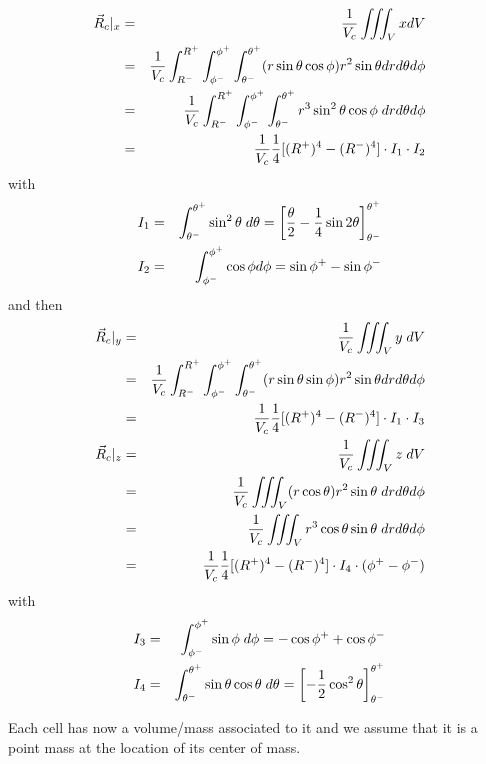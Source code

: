 \begin{eqnarray}
\vec{R}_c|_x
&=&\frac{1}{V_c}
\iiint_V x dV \nonumber\\
&=& \frac{1}{V_c}
\int_{R^-}^{R^+} \int_{\phi^-}^{\phi^+} \int_{\theta^-}^{\theta^+} 
(r \sin\theta \cos\phi) 
r^2 \sin \theta dr d\theta d\phi \nonumber\\
&=&\frac{1}{V_c}
 \int_{R^-}^{R^+} \int_{\phi^-}^{\phi^+} \int_{\theta^-}^{\theta^+} 
r^3 \sin^2 \theta  \cos \phi \; dr d\theta d\phi \nonumber\\
&=&\frac{1}{V_c}
 \frac{1}{4}[(R^+)^4-(R^-)^4] \cdot I_1 \cdot I_2 
\end{eqnarray}
with
\begin{eqnarray}
I_1&=&\int_{\theta^-}^{\theta^+}  \sin^2 \theta \; d\theta 
= \left[ \frac{\theta}{2} -\frac{1}{4}\sin 2\theta \right]_{\theta^-}^{\theta^+} \nonumber\\
I_2&=&\int_{\phi^-}^{\phi^+}  \cos \phi d\phi = \sin \phi^+ - \sin \phi^- \nonumber
\end{eqnarray}
and then 
\begin{eqnarray}
\vec{R}_c|_y
&=&
\frac{1}{V_c}
\iiint_V y \; dV \nonumber\\
&=& \frac{1}{V_c}
\int_{R^-}^{R^+} \int_{\phi^-}^{\phi^+} \int_{\theta^-}^{\theta^+} 
(r \sin\theta \sin\phi) 
r^2 \sin \theta dr d\theta d\phi \nonumber\\
&=&\frac{1}{V_c}
 \frac{1}{4}[(R^+)^4-(R^-)^4] \cdot I_1 \cdot I_3 \nonumber\\ 
\vec{R}_c|_z
&=&\frac{1}{V_c}
\iiint_V z \; dV \nonumber\\
&=&\frac{1}{V_c}
\iiint_V (r \cos \theta) r^2 \sin \theta \; dr d\theta d\phi  \nonumber\\
&=&\frac{1}{V_c}
\iiint_V r^3 \cos \theta \sin \theta \; dr d\theta d\phi  \nonumber\\
&=& \frac{1}{V_c}
\frac{1}{4}[(R^+)^4-(R^-)^4] \cdot I_4 \cdot (\phi^+-\phi^-)
\end{eqnarray}
with
\begin{eqnarray}
I_3&=&\int_{\phi^-}^{\phi^+}  \sin \phi \; d\phi = -\cos \phi^+ + \cos \phi^- \nonumber\\
I_4&=&\int_{\theta^-}^{\theta^+}  \sin \theta \cos\theta \; d\theta 
= \left[-\frac{1}{2}\cos^2 \theta \right]_{\theta^-}^{\theta^+}  \nonumber
\end{eqnarray}

Each cell has now a volume/mass associated to it and we assume that it is 
a point mass at the location of its center of mass. 

